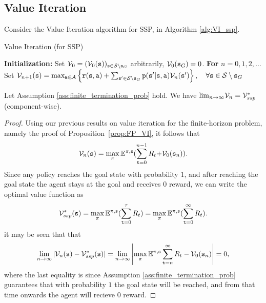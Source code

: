 \subsection{Value Iteration}
Consider the Value Iteration algorithm for SSP, in Algorithm \ref{alg:VI_ssp}.
\begin{algorithm}
\caption{Value Iteration (for SSP) }
\label{alg:VI_ssp}
\begin{algorithmic}[1]
\State \textbf{Initialization:} Set $\mathcal{V}_0 = (\mathcal{V}_0({\tt s}))_{{\tt s} \in \mathcal{S} \setminus {\tt s}_G}$ arbitrarily, $\mathcal{V}_0({\tt s}_G)=0$.
\State \textbf{For} {$n = 0, 1, 2, \ldots$}
    \State \quad Set $\mathcal{V}_{n + 1}({\tt s}) = \max_{{\tt a} \in \mathcal{A}} \left\{ {\tt r}({\tt s},{\tt a}) + \sum_{{\tt s}' \in \mathcal{S} \setminus {\tt s}_G} {\tt p}({\tt s}'|{\tt s},{\tt a})\mathcal{V}_n({\tt s}') \right\}, \quad \forall {\tt s} \in \mathcal{S} \setminus {\tt s}_G$
\end{algorithmic}
\end{algorithm}

\begin{theorem}\label{thm:_VI_ssp}
Let Assumption \ref{ass:finite_termination_prob} hold. We have ${\lim _{n \to \infty }}{\mathcal{V}_n} = \mathcal{V}_{ssp}^*$
(component-wise). 
\end{theorem}

\begin{proof}
Using our previous results on value iteration for the finite-horizon
problem, namely the proof of Proposition~\ref{prop:FP_VI}, it
follows that
\[{\mathcal{V}_n}({\tt s}) = \mathop {\max }\limits_\pi  {\ensuremath{\mathbb{E}}^{\pi,{\tt s}}}(\sum\limits_{{\tt t} = 0}^{n - 1} {{R_t} + } {\mathcal{V}_0}({{\tt s}_n})).\]
Since any policy reaches the goal state with probability $1$, and after reaching the goal state the agent stays at the goal and receives $0$ reward, we can write the optimal value function as
\[{\mathcal{V}_{ssp}^*}({\tt s}) = \mathop {\max }\limits_\pi  {\ensuremath{\mathbb{E}}^{\pi,{\tt s}}}(\sum\limits_{{\tt t} = 0}^\tau  {{R_t}} ) = \mathop {\max }\limits_\pi  {\ensuremath{\mathbb{E}}^{\pi,{\tt s}}}(\sum\limits_{{\tt t} = 0}^\infty  {{R_t}} ).\]
it may be seen that that
    \[\lim_{n \to \infty}|{\mathcal{V}_n}({\tt s}) - \mathcal{V}_{ssp}^*({\tt s})| = \lim_{n \to \infty} \left|\mathop {\max }\limits_\pi  {\ensuremath{\mathbb{E}}^{\pi,{\tt s}}} \sum\limits_{{\tt t} = n}^{\infty} {R_t} - {\mathcal{V}_0}({{\tt s}_n})\right| = 0,\]
where the last equality is since Assumption \ref{ass:finite_termination_prob} guarantees that with probability $1$ the goal state will be reached, and from that time onwards the agent will recieve $0$ reward.
\end{proof}

